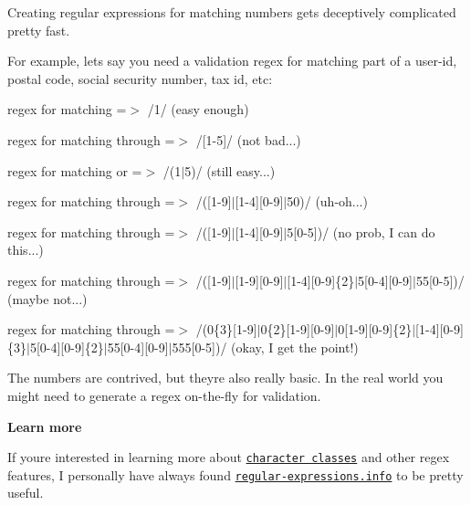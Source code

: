 Creating regular expressions for matching numbers gets deceptively complicated pretty fast.

For example, let\textquotesingle{}s say you need a validation regex for matching part of a user-\/id, postal code, social security number, tax id, etc\+:


\begin{DoxyItemize}
\item regex for matching {} =$>$ {\ttfamily /1/} (easy enough)
\item regex for matching {} through {} =$>$ {\ttfamily /\mbox{[}1-\/5\mbox{]}/} (not bad...)
\item regex for matching {} or {} =$>$ {\ttfamily /(1$\vert$5)/} (still easy...)
\item regex for matching {} through {} =$>$ {\ttfamily /(\mbox{[}1-\/9\mbox{]}$\vert$\mbox{[}1-\/4\mbox{]}\mbox{[}0-\/9\mbox{]}$\vert$50)/} (uh-\/oh...)
\item regex for matching {} through {} =$>$ {\ttfamily /(\mbox{[}1-\/9\mbox{]}$\vert$\mbox{[}1-\/4\mbox{]}\mbox{[}0-\/9\mbox{]}$\vert$5\mbox{[}0-\/5\mbox{]})/} (no prob, I can do this...)
\item regex for matching {} through {} =$>$ {\ttfamily /(\mbox{[}1-\/9\mbox{]}$\vert$\mbox{[}1-\/9\mbox{]}\mbox{[}0-\/9\mbox{]}$\vert$\mbox{[}1-\/4\mbox{]}\mbox{[}0-\/9\mbox{]}\{2\}$\vert$5\mbox{[}0-\/4\mbox{]}\mbox{[}0-\/9\mbox{]}$\vert$55\mbox{[}0-\/5\mbox{]})/} (maybe not...)
\item regex for matching {} through {} =$>$ {\ttfamily /(0\{3\}\mbox{[}1-\/9\mbox{]}$\vert$0\{2\}\mbox{[}1-\/9\mbox{]}\mbox{[}0-\/9\mbox{]}$\vert$0\mbox{[}1-\/9\mbox{]}\mbox{[}0-\/9\mbox{]}\{2\}$\vert$\mbox{[}1-\/4\mbox{]}\mbox{[}0-\/9\mbox{]}\{3\}$\vert$5\mbox{[}0-\/4\mbox{]}\mbox{[}0-\/9\mbox{]}\{2\}$\vert$55\mbox{[}0-\/4\mbox{]}\mbox{[}0-\/9\mbox{]}$\vert$555\mbox{[}0-\/5\mbox{]})/} (okay, I get the point!)
\end{DoxyItemize}

The numbers are contrived, but they\textquotesingle{}re also really basic. In the real world you might need to generate a regex on-\/the-\/fly for validation.

{\bfseries Learn more}

If you\textquotesingle{}re interested in learning more about \href{http://www.regular-expressions.info/charclass.html}{\tt character classes} and other regex features, I personally have always found \href{http://www.regular-expressions.info/charclass.html}{\tt regular-\/expressions.\+info} to be pretty useful.

